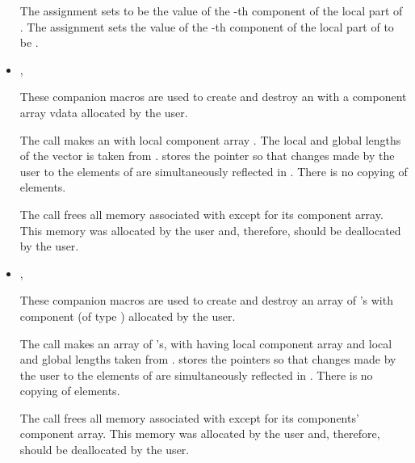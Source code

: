 \begin{itemize}
      The assignment  sets  to be the value of 
      the -th component of the local part of . 
      The assignment    
      sets the value of the -th component of the local part of  
      to be .        

\item {}, 

      These companion macros are used to create and          
      destroy an  with a component array vdata        
      allocated by the user.                                   
                                                               
      The call  makes  an        
       with local component array . 
      The local and global lengths of the  
      vector  is taken from .                             
       stores the pointer  so that changes      
      made by the user to the elements of  are           
      simultaneously reflected in . There is no copying of    
      elements.                                                
                                                               
      The call  frees all memory associated     
      with  except for its component array. This memory was   
      allocated by the user and, therefore, should be          
      deallocated by the user.   

\item {}, 
                             
      These companion macros are used to create and destroy  
      an array of 's with component  
      (of type ) allocated by the user.                                                
                                                               
      The call  makes   
       an array of  's, with  having
      local component array  and local and global lengths taken 
      from .    
       stores the pointers  so that        
      changes made by the user to the elements of  are  
      simultaneously reflected in . There is no copying of   
      elements.                                                
                                                               
      The call  frees all memory associated   
      with  except for its components' component array.      
      This memory was allocated by the user and, therefore,    
      should be deallocated by the user.                       

\end{itemize}

